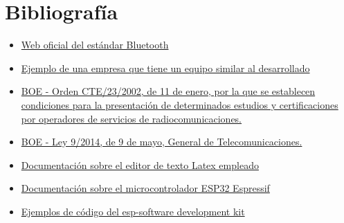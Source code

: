 \documentclass[paper=a4, fontsize=11pt,twoside]{scrartcl}	%
\begin{document}
\section{Bibliografía}
    \begin{itemize}
        \item \href{https://www.bluetooth.com/}{Web oficial del estándar Bluetooth}
        \item \href{https://accent-systems.com/es/producto/ibks-105/}{Ejemplo de una empresa que tiene un equipo
        similar al desarrollado}
        \item \href{https://www.boe.es/diario_boe/txt.php?id=BOE-A-2002-694}{BOE - Orden CTE/23/2002, de 11 de enero, por la que se establecen condiciones para la presentación de determinados estudios y certificaciones por operadores de servicios de radiocomunicaciones.}
        \item \href{https://www.boe.es/buscar/act.php?id=BOE-A-2014-4950}{BOE - Ley 9/2014, de 9 de mayo, General de Telecomunicaciones.}
        \item \href{http://www.sharelatex.com}{Documentación sobre el editor de texto Latex empleado} 
        \item \href{https://docs.espressif.com/projects/esp-idf/en/stable/}{Documentación sobre el microcontrolador ESP32 Espressif}
        \item \href{https://github.com/espressif/esp-idf}{Ejemplos de código del esp-software development kit}
    \end{itemize}
\end{document}
